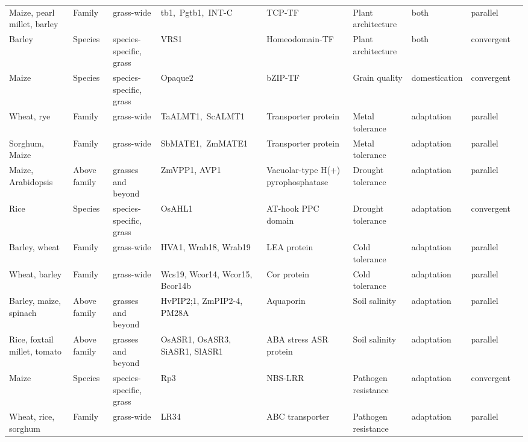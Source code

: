 \documentclass[12pt]{article}
\begin{document}
\begin{table}
\begin{center}
\begin{tabular}{G{3.5cm}G{2.5cm}C{3.10cm}C{3.5cm}C{1.95cm}G{2.0cm}G{1.8cm}G{1.5cm}G{1.5cm}}
Maize, pearl millet, barley & Family & grass-wide & tb1, Pgtb1, INT-C & TCP-TF & Plant architecture & both & parallel & \citep{Studer2011, Remigereau2011, Ramsay2011}\\
Barley & Species & species-specific, grass & VRS1 & Homeodomain-TF & Plant architecture & both & convergent & \citep{Martin2013}\\
Maize & Species & species-specific, grass & Opaque2 & bZIP-TF & Grain quality & domestication & convergent & \citep{Martin2013}\\
Wheat, rye & Family & grass-wide & TaALMT1, ScALMT1 & Transporter protein & Metal tolerance & adaptation & parallel & \citep{Martin2013}\\
Sorghum, Maize & Family & grass-wide & SbMATE1, ZmMATE1 & Transporter protein & Metal tolerance & adaptation & parallel & \citep{Martin2013}\\
Maize, Arabidopsis & Above family & grasses and beyond & ZmVPP1, AVP1 & Vacuolar-type H(+) pyrophosphatase & Drought tolerance & adaptation & parallel & \citep{Wang2016}\\
Rice & Species & species-specific, grass & OsAHL1 & AT-hook PPC domain & Drought tolerance & adaptation & convergent & \citep{Zhou2016}\\
Barley, wheat & Family & grass-wide & HVA1, Wrab18, Wrab19 & LEA protein & Cold tolerance & adaptation & parallel & \citep{Hong1988, pmid16755132}\\
Wheat, barley & Family & grass-wide & Wcs19, Wcor14, Wcor15, Bcor14b & Cor protein & Cold tolerance & adaptation & parallel & \citep{Takumi2003}\\
Barley, maize, spinach & Above family & grasses and beyond & HvPIP2;1, ZmPIP2-4, PM28A & Aquaporin & Soil salinity & adaptation & parallel & \citep{Katsuhara2002, Zhu2005, Fotiadis2000}\\
Rice, foxtail millet, tomato & Above family & grasses and beyond & OsASR1, OsASR3, SiASR1, SlASR1 & ABA stress ASR protein & Soil salinity & adaptation & parallel & \citep{Li2017, Konrad2008}\\
Maize & Species & species-specific, grass & Rp3 & NBS-LRR & Pathogen resistance & adaptation & convergent & \citep{pmid12242248}\\
Wheat, rice, sorghum & Family & grass-wide & LR34 & ABC transporter & Pathogen resistance & adaptation & parallel & \citep{Krattinger2010}\\
\end{tabular}
\end{center}
\end{table}
\end{document}
